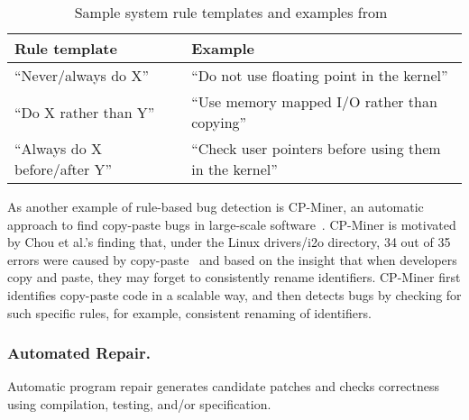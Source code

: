\begin{table}[]
\centering
\caption{Sample system rule templates and examples from~\cite{Engler2000:CSR}}
\label{tab:rule}
\begin{tabular}{l|l}
\toprule
Rule template                  & Example                                                 \\ \hline
``Never/always do X''          & ``Do not use floating point in the kernel''             \\\hline
``Do X rather than Y''         & ``Use memory mapped I/O rather than copying''           \\ \hline
``Always do X before/after Y'' & ``Check user pointers before using them in the kernel''\\
\bottomrule
\end{tabular}
\end{table} 

As another example of rule-based bug detection is CP-Miner, an automatic approach to find copy-paste bugs in large-scale software~\cite{Li2006:CPMiner}. CP-Miner is motivated by Chou et al.'s finding that, under the Linux {\sf drivers/i2o} directory, 34 out of 35 errors were caused by copy-paste~\cite{Chou2001:ESO} and based on the insight that when developers copy and paste, they may forget to consistently rename identifiers. CP-Miner first identifies copy-paste code in a scalable way, and then detects bugs by checking for such specific rules, for example, consistent renaming of identifiers. %
\subsubsection{Automated Repair.} 
Automatic program repair generates candidate patches and checks correctness using compilation, testing, and/or specification. 

